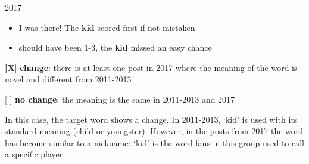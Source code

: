 \documentclass[11pt,a4paper]{article}
\begin{document}
\begin{minipage}{15cm}
\vspace*{0.25cm}

2017
\begin{itemize}
\item I was there! The \textbf{kid} scored first if not mistaken
\item should have been 1-3, the \textbf{kid} missed an easy chance
\end{itemize}

\vspace*{0.25cm}

\textbf{[X}]  \textbf{change}: there is at least one post in 2017 where the meaning of the word is novel and different from 2011-2013

[  ] \textbf{no change}: the meaning is the same in 2011-2013 and 2017

\vspace*{0.25cm}

In this case, the target word shows a change. In 2011-2013, `kid' is used with its standard meaning (child or youngster). However, in the posts from 2017 the word has become similar to a nickname: `kid' is the word fans in this group used to call a specific player.
\end{minipage}

\pagebreak

\clearpage

\end{document}
